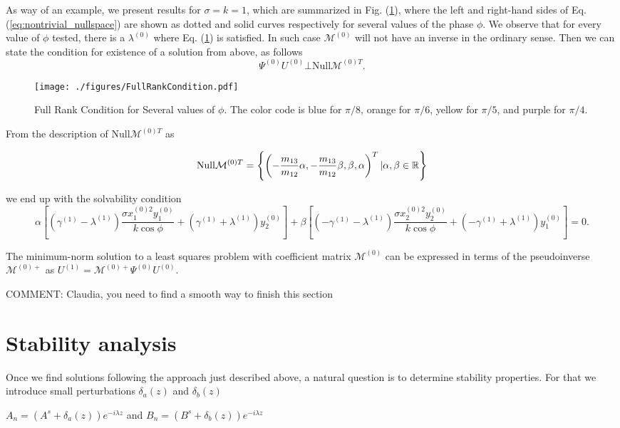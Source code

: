 \documentclass{aip-cp}
\newcommand{\MM}{{\mathcal M}}
\begin{document}
As way of an example, we present results for $\sigma=k=1$, which are summarized  in Fig. (\ref{fig:rank_condition}), where the left and right-hand sides of Eq. 
(\ref{eq:nontrivial_nullspace}) are shown as dotted and solid curves respectively for several values of the phase $\phi$. We observe that for every value of $\phi$ tested,
there is a $\lambda^{(0)}$ where Eq. (\ref{fig:rank_condition}) is satisfied. In such case $\MM^{(0)}$ will not have an inverse in the ordinary sense. Then we can state the condition for existence of a solution from above, as follows
\begin{equation}
\Psi^{(0)} U^{(0)}\bot \mathrm{Null}\mathcal{M}^{(0)T}.
 \label{eq:solvability-condition}
\end{equation}

\begin{figure}
 \centering
  \texttt{[image: ./figures/FullRankCondition.pdf]}
  \caption{Full Rank Condition for Several values of $\phi$. The color code is blue for $\pi/8$, orange for $\pi/6$, yellow for $\pi/5$, and purple for $\pi/4$.}
\label{fig:rank_condition}
\end{figure}

From the description of  $\mathrm{Null}\MM^{(0)T}$ as

\begin{equation}
\mathrm{Null}\MM^{(0)T}=\left\{ \left(-\frac{m_{13}}{m_{12}} \alpha, -\frac{m_{13}}{m_{12}}\beta, \beta, \alpha \right)^{T}\arrowvert \alpha,\beta \in \mathbb{R} \right\}  
\end{equation}

we end up with the solvability condition
\begin{equation}
 \alpha\left[\left(\gamma^{(1)}-\lambda^{(1)}\right)\frac{{\sigma x_{1}^{(0)2}y_{1}^{(0)}}}{k\cos{\phi}}+\left(\gamma^{(1)}+\lambda^{(1)}\right)y_2^{(0)}\right]+\beta\left[\left(-\gamma^{(1)}-\lambda^{(1)}\right)\frac{{\sigma x_{2}^{(0)2}y_{2}^{(0)}}}{k\cos{\phi}}+\left(-\gamma^{(1)}+\lambda^{(1)}\right)y_1^{(0)}\right]=0.
\label{solvability_condition}
\end{equation}

The minimum-norm solution to a least squares  problem with coefficient matrix $\MM^{(0)}$
can be expressed in terms of the pseudoinverse $\mathcal{M}^{(0)+}$ as $U^{(1)}=\mathcal{M}^{(0)+}\Psi^{(0)} U^{(0)}$.

COMMENT: Claudia, you need to find a smooth way to finish this section

\section{Stability analysis}
Once we find solutions following the approach just described above, a natural question is to determine stability properties. For that we introduce small perturbations $\delta_{a}\left(z\right)$ and $\delta_{b}\left(z\right)$
\begin{center}
$A_n=\left(A^{s}+\delta_{a}\left(z\right)\right)e^{-i\lambda z}$ and $B_n=\left(B^{s}+\delta_{b}\left(z\right)\right)e^{-i\lambda z}$
\end{center}
\end{document}
